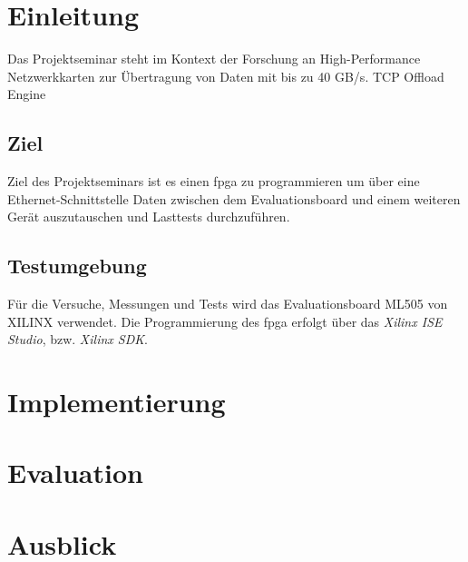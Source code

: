 \chapter{Einleitung}

Das Projektseminar steht im Kontext der Forschung an High-Performance Netzwerkkarten zur Übertragung von Daten mit bis zu 40 GB/s. TCP Offload Engine

\section{Ziel}

Ziel des Projektseminars ist es einen \gls{fpga} zu programmieren um über eine Ethernet-Schnittstelle Daten zwischen dem Evaluationsboard und einem weiteren Gerät auszutauschen und Lasttests durchzuführen.

\section{Testumgebung}

Für die Versuche, Messungen und Tests wird das Evaluationsboard ML505 von XILINX verwendet. Die Programmierung des \gls{fpga} erfolgt über das \textit{Xilinx ISE Studio}, bzw. \textit{Xilinx SDK}.



\chapter{Implementierung}

\chapter{Evaluation}

\chapter{Ausblick}